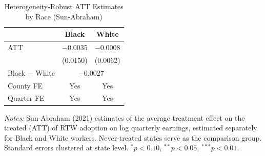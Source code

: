 \begin{table}[htbp]
\centering
\caption{Heterogeneity-Robust ATT Estimates by Race (Sun-Abraham)}
\label{tab:att_race}
\begin{threeparttable}
\begin{tabular}{lcc}
\toprule
 & Black & White \\
\midrule
ATT & $-$0.0035 & $-$0.0008 \\
 & (0.0150) & (0.0062) \\
\midrule
Black $-$ White & \multicolumn{2}{c}{$-$0.0027} \\
\midrule
County FE & Yes & Yes \\
Quarter FE & Yes & Yes \\
\bottomrule
\end{tabular}
\begin{tablenotes}[flushleft]\footnotesize
\item \textit{Notes:} Sun-Abraham (2021) estimates of the average treatment effect on the treated (ATT) of RTW adoption on log quarterly earnings, estimated separately for Black and White workers. Never-treated states serve as the comparison group. Standard errors clustered at state level. $^{*}p<0.10$, $^{**}p<0.05$, $^{***}p<0.01$.
\end{tablenotes}
\end{threeparttable}
\end{table}

